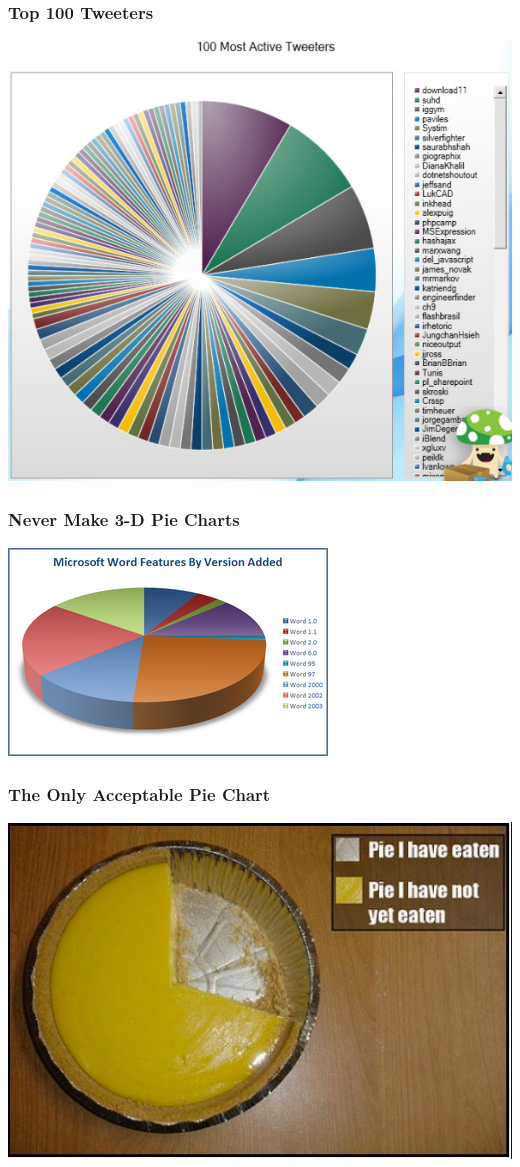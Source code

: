 \documentclass{beamer} %
\begin{document}
\begin{frame}\frametitle{Top 100 Tweeters}
	\centering
	\includegraphics[width=0.77\linewidth]{tweet.jpg}
\end{frame}


\begin{frame}\frametitle{Never Make 3-D Pie Charts}
	\centering
	\includegraphics[width=0.87\linewidth]{3dpie.png}
\end{frame}


\begin{frame}\frametitle{The Only Acceptable Pie Chart}
	\centering
	\includegraphics[width=\linewidth]{pieseaten.png}
\end{frame}
\end{document}
